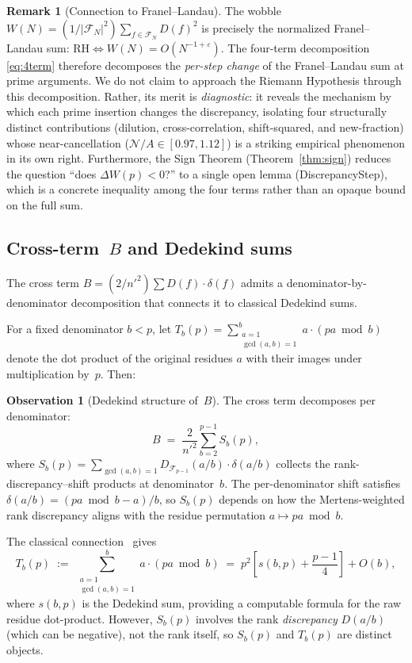 \documentclass[11pt]{article}
\theoremstyle{definition}
\newtheorem{remark}[theorem]{Remark}
\newtheorem{observation}[theorem]{Observation}
\newcommand{\F}{\mathcal{F}}
\begin{document}
\begin{remark}[Connection to Franel--Landau]\label{rem:franel-connection}
The wobble $W(N) = (1/|\F_N|^2)\sum_{f \in \F_N} D(f)^2$ is precisely
the normalized Franel--Landau sum: $\text{RH} \Leftrightarrow W(N) = O(N^{-1+\varepsilon})$.
The four-term decomposition \eqref{eq:4term} therefore decomposes
the \emph{per-step change} of the Franel--Landau sum at prime arguments.
We do not claim to approach the Riemann Hypothesis through this
decomposition.  Rather, its merit is \emph{diagnostic}: it reveals
the mechanism by which each prime insertion changes the discrepancy,
isolating four structurally distinct contributions (dilution, cross-correlation,
shift-squared, and new-fraction) whose near-cancellation
($\mathcal{N}/A \in [0.97, 1.12]$) is a striking empirical phenomenon in
its own right.  Furthermore, the Sign Theorem
(Theorem~\ref{thm:sign}) reduces the
question ``does $\Delta W(p) < 0$?'' to a single open lemma
(DiscrepancyStep), which is a concrete inequality among
the four terms rather than an opaque bound on the full sum.
\end{remark}

\subsection{Cross-term~$B$ and Dedekind sums}\label{subsec:dedekind}

The cross term $B = (2/{n'}^2)\sum D(f)\cdot\delta(f)$ admits a
denominator-by-denominator decomposition that connects it to
classical Dedekind sums.

For a fixed denominator $b < p$, let $T_b(p)
= \sum_{\substack{a=1\\\gcd(a,b)=1}}^{b} a\cdot(pa \bmod b)$
denote the dot product of the original residues $a$ with their
images under multiplication by~$p$.  Then:

\begin{observation}[Dedekind structure of~$B$]\label{obs:dedekind-B}
The cross term decomposes per denominator:
\[
  B \;=\; \frac{2}{{n'}^2} \sum_{b=2}^{p-1} S_b(p),
\]
where $S_b(p) = \sum_{\gcd(a,b)=1} D_{\F_{p-1}}(a/b) \cdot \delta(a/b)$
collects the rank-discrepancy--shift products at denominator~$b$.
The per-denominator shift satisfies $\delta(a/b) = (pa \bmod b - a)/b$,
so $S_b(p)$ depends on how the Mertens-weighted rank discrepancy
aligns with the residue permutation $a \mapsto pa \bmod b$.

The classical connection~\cite{Garcia2025} gives
\[
  T_b(p) \;:=\; \sum_{\substack{a=1\\\gcd(a,b)=1}}^{b} a\cdot(pa \bmod b)
  \;=\; p^2\!\left[s(b,p) + \frac{p-1}{4}\right] + O(b),
\]
where $s(b,p)$ is the Dedekind sum, providing a computable formula
for the raw residue dot-product.  However, $S_b(p)$ involves the
rank \emph{discrepancy} $D(a/b)$ (which can be negative), not the rank
itself, so $S_b(p)$ and $T_b(p)$ are distinct objects.
\end{observation}
\end{document}

